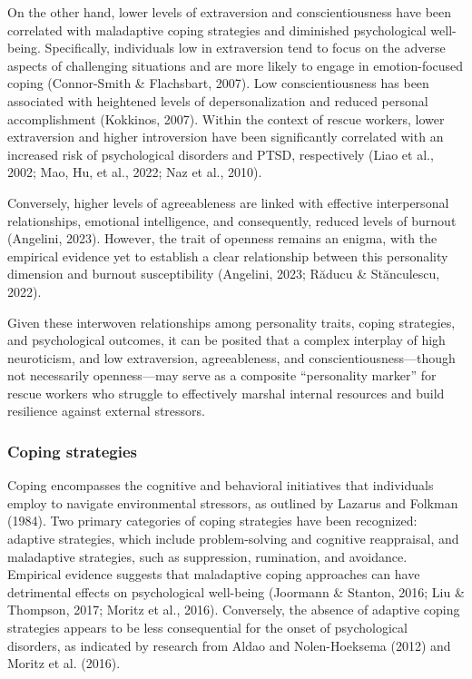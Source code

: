 \documentclass[
  man,floatsintext]{apa7}
\begin{document}
On the other hand, lower levels of extraversion and conscientiousness have been correlated with maladaptive coping strategies and diminished psychological well-being. Specifically, individuals low in extraversion tend to focus on the adverse aspects of challenging situations and are more likely to engage in emotion-focused coping (Connor-Smith \& Flachsbart, 2007). Low conscientiousness has been associated with heightened levels of depersonalization and reduced personal accomplishment (Kokkinos, 2007). Within the context of rescue workers, lower extraversion and higher introversion have been significantly correlated with an increased risk of psychological disorders and PTSD, respectively (Liao et al., 2002; Mao, Hu, et al., 2022; Naz et al., 2010).

Conversely, higher levels of agreeableness are linked with effective interpersonal relationships, emotional intelligence, and consequently, reduced levels of burnout (Angelini, 2023). However, the trait of openness remains an enigma, with the empirical evidence yet to establish a clear relationship between this personality dimension and burnout susceptibility (Angelini, 2023; Răducu \& Stănculescu, 2022).

Given these interwoven relationships among personality traits, coping strategies, and psychological outcomes, it can be posited that a complex interplay of high neuroticism, and low extraversion, agreeableness, and conscientiousness---though not necessarily openness---may serve as a composite ``personality marker'' for rescue workers who struggle to effectively marshal internal resources and build resilience against external stressors.

\hypertarget{coping-strategies}{%
\subsubsection{Coping strategies}\label{coping-strategies}}

Coping encompasses the cognitive and behavioral initiatives that individuals employ to navigate environmental stressors, as outlined by Lazarus and Folkman (1984). Two primary categories of coping strategies have been recognized: adaptive strategies, which include problem-solving and cognitive reappraisal, and maladaptive strategies, such as suppression, rumination, and avoidance. Empirical evidence suggests that maladaptive coping approaches can have detrimental effects on psychological well-being (Joormann \& Stanton, 2016; Liu \& Thompson, 2017; Moritz et al., 2016). Conversely, the absence of adaptive coping strategies appears to be less consequential for the onset of psychological disorders, as indicated by research from Aldao and Nolen-Hoeksema (2012) and Moritz et al. (2016).
\end{document}
